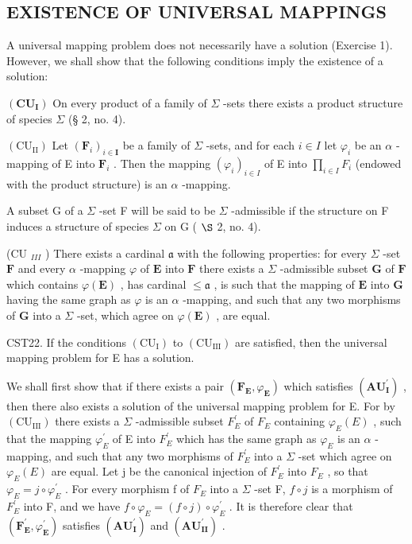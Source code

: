 \subsection{EXISTENCE OF UNIVERSAL MAPPINGS}

A universal mapping problem does not necessarily have a solution (Exercise 1). However, we shall show that the following conditions imply the existence of a solution:

\((\mathbf{CU}_{\mathbf{I}})\) On every product of a family of \(\Sigma\) -sets there exists a product structure of species \(\Sigma\) (§ 2, no. 4).

\((\mathrm{CU}_{\mathrm{II}})\) Let \((\mathbf{F}_i)_{i\in \mathbf{I}}\) be a family of \(\Sigma\) -sets, and for each \(i\in I\) let \(\varphi_i\) be an \(\alpha\) -mapping of E into \(\mathbf{F}_i\) . Then the mapping \((\varphi_i)_{i\in I}\) of E into \(\prod_{i\in I}F_i\) (endowed with the product structure) is an \(\alpha\) -mapping.

A subset G of a \(\Sigma\) -set F will be said to be \(\Sigma\) -admissible if the structure on F induces a structure of species \(\Sigma\) on G ( \(\S\) 2, no. 4).

(CU \(_{III}\) ) There exists a cardinal \(\mathfrak{a}\) with the following properties: for every \(\Sigma\) -set \(\mathbf{F}\) and every \(\alpha\) -mapping \(\varphi\) of \(\mathbf{E}\) into \(\mathbf{F}\) there exists a \(\Sigma\) -admissible subset \(\mathbf{G}\) of \(\mathbf{F}\) which contains \(\varphi(\mathbf{E})\) , has cardinal \(\leqslant \mathfrak{a}\) , is such that the mapping of \(\mathbf{E}\) into \(\mathbf{G}\) having the same graph as \(\varphi\) is an \(\alpha\) -mapping, and such that any two morphisms of \(\mathbf{G}\) into a \(\Sigma\) -set, which agree on \(\varphi(\mathbf{E})\) , are equal.

CST22. If the conditions \((\mathrm{CU}_{\mathrm{I}})\) to \((\mathrm{CU}_{\mathrm{III}})\) are satisfied, then the universal mapping problem for E has a solution.

We shall first show that if there exists a pair \((\mathbf{F}_{\mathbf{E}}, \varphi_{\mathbf{E}})\) which satisfies \((\mathbf{AU}_{\mathbf{I}}^{\prime})\) , then there also exists a solution of the universal mapping problem for E. For by \((\mathrm{CU}_{\mathrm{III}})\) there exists a \(\Sigma\) -admissible subset \(F_{E}^{\prime}\) of \(F_{E}\) containing \(\varphi_{E}(E)\) , such that the mapping \(\varphi_{E}^{\prime}\) of E into \(F_{E}^{\prime}\) which has the same graph as \(\varphi_{E}\) is an \(\alpha\) -mapping, and such that any two morphisms of \(F_{E}^{\prime}\) into a \(\Sigma\) -set which agree on \(\varphi_{E}(E)\) are equal. Let j be the canonical injection of \(F_{E}^{\prime}\) into \(F_{E}\) , so that \(\varphi_{E} = j \circ \varphi_{E}^{\prime}\) . For every morphism f of \(F_{E}\) into a \(\Sigma\) -set F, \(f \circ j\) is a morphism of \(F_{E}^{\prime}\) into F, and we have \(f \circ \varphi_{E} = (f \circ j) \circ \varphi_{E}^{\prime}\) . It is therefore clear that \((\mathbf{F}_{\mathbf{E}}^{\prime}, \varphi_{\mathbf{E}}^{\prime})\) satisfies \((\mathbf{AU}_{\mathbf{I}}^{\prime})\) and \((\mathbf{AU}_{\mathbf{II}}^{\prime})\) .

